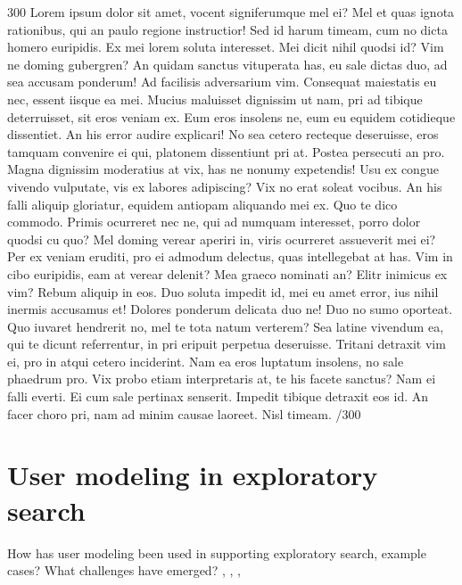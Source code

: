 \documentclass{sigchi}
\begin{document}
300 Lorem ipsum dolor sit amet, vocent signiferumque mel ei? Mel et quas ignota rationibus, qui an paulo regione instructior! Sed id harum timeam, cum no dicta homero euripidis. Ex mei lorem soluta interesset. Mei dicit nihil quodsi id? Vim ne doming gubergren? An quidam sanctus vituperata has, eu sale dictas duo, ad sea accusam ponderum! Ad facilisis adversarium vim. Consequat maiestatis eu nec, essent iisque ea mei. Mucius maluisset dignissim ut nam, pri ad tibique deterruisset, sit eros veniam ex. Eum eros insolens ne, eum eu equidem cotidieque dissentiet. An his error audire explicari! No sea cetero recteque deseruisse, eros tamquam convenire ei qui, platonem dissentiunt pri at. Postea persecuti an pro. Magna dignissim moderatius at vix, has ne nonumy expetendis! Usu ex congue vivendo vulputate, vis ex labores adipiscing? Vix no erat soleat vocibus. An his falli aliquip gloriatur, equidem antiopam aliquando mei ex. Quo te dico commodo. Primis ocurreret nec ne, qui ad numquam interesset, porro dolor quodsi cu quo? Mel doming verear aperiri in, viris ocurreret assueverit mei ei? Per ex veniam eruditi, pro ei admodum delectus, quas intellegebat at has. Vim in cibo euripidis, eam at verear delenit? Mea graeco nominati an? Elitr inimicus ex vim? Rebum aliquip in eos. Duo soluta impedit id, mei eu amet error, ius nihil inermis accusamus et! Dolores ponderum delicata duo ne! Duo no sumo oporteat. Quo iuvaret hendrerit no, mel te tota natum verterem? Sea latine vivendum ea, qui te dicunt referrentur, in pri eripuit perpetua deseruisse. Tritani detraxit vim ei, pro in atqui cetero inciderint. Nam ea eros luptatum insolens, no sale phaedrum pro. Vix probo etiam interpretaris at, te his facete sanctus? Nam ei falli everti. Ei cum sale pertinax senserit. Impedit tibique detraxit eos id. An facer choro pri, nam ad minim causae laoreet. Nisl timeam. /300

\section{User modeling in exploratory search}
How has user modeling been used in supporting exploratory search, example cases? What challenges have emerged? 
\cite{oconnor10}, \cite{sugi04}, \cite{white07}, \cite{kules09}
\end{document}

